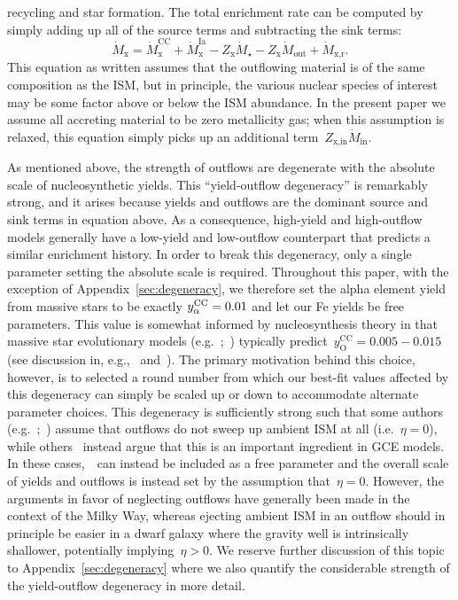 \documentclass[ms.tex]{subfiles}
\begin{document}
recycling and star formation.
The total enrichment rate can be computed by simply adding up all of the source
terms and subtracting the sink terms:
\begin{equation}
\dot{M}_\text{x} = \dot{M}_\text{x}^\text{CC} + \dot{M}_\text{x}^\text{Ia} -
Z_\text{x}\dot{M}_\star - Z_\text{x}\dot{M}_\text{out} + \dot{M}_{\text{x,r}}.
\label{eq:enrichment}
\end{equation}
This equation as written assumes that the outflowing material is of the same
composition as the ISM, but in principle, the various nuclear species of
interest may be some factor above or below the ISM abundance.
In the present paper we assume all accreting material to be zero metallicity
gas; when this assumption is relaxed, this equation simply picks up an
additional term~$Z_\text{x,in}\dot{M}_\text{in}$.
\par
As mentioned above, the strength of outflows are degenerate with the absolute
scale of nucleosynthetic yields.
This ``yield-outflow degeneracy'' is remarkably strong, and it arises because
yields and outflows are the dominant source and sink terms in equation
 above.
As a consequence, high-yield and high-outflow models generally have a
low-yield and low-outflow counterpart that predicts a similar enrichment
history.
In order to break this degeneracy, only a single parameter setting the absolute
scale is required.
Throughout this paper, with the exception of Appendix~\ref{sec:degeneracy},
we therefore set the alpha element yield from massive stars to be exactly
$y_\alpha^\text{CC} = 0.01$ and let our Fe yields be free parameters.
This value is somewhat informed by nucleosynthesis theory in that massive star
evolutionary models (e.g.~\citealp*{Nomoto2013};~\citealp{Sukhbold2016,
Limongi2018}) typically predict~$y_\text{O}^\text{CC} = 0.005 - 0.015$ (see
discussion in, e.g.,~\citealp{Weinberg2017} and~\citealp{Johnson2020}).
The primary motivation behind this choice, however, is to selected a round
number from which our best-fit values affected by this degeneracy can simply be
scaled up or down to accommodate alternate parameter choices.
This degeneracy is sufficiently strong such that some authors
(e.g.~\citealp*{Minchev2013, Minchev2014};~\citealp{Minchev2017,
Spitoni2020, Spitoni2021}) assume that outflows do not sweep up ambient ISM at
all (i.e.~$\eta = 0$), while others~\citep[e.g.][]{Andrews2017, Weinberg2017,
Cote2017, Trueman2022} instead argue that this is an important ingredient in
GCE models.
In these cases,~\yacc~can instead be included as a free parameter and the
overall scale of yields and outflows is instead set by the assumption
that~$\eta = 0$.
However, the arguments in favor of neglecting outflows have generally been made
in the context of the Milky Way, whereas ejecting ambient ISM in an outflow
should in principle be easier in a dwarf galaxy where the gravity well is
intrinsically shallower, potentially implying~$\eta > 0$.
We reserve further discussion of this topic to Appendix~\ref{sec:degeneracy}
where we also quantify the considerable strength of the yield-outflow
degeneracy in more detail.
\end{document}
